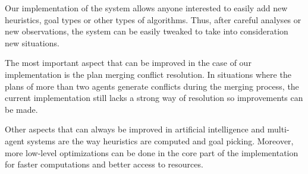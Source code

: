Our implementation of the system allows anyone interested to easily add new heuristics, goal types or other
types of algorithms. Thus, after careful analyses or new observations, the system can be easily tweaked to
take into consideration new situations.

The most important aspect that can be improved in the case of our implementation is the plan merging conflict
resolution. In situations where the plans of more than two agents generate conflicts during the merging
process, the current implementation still lacks a strong way of resolution so improvements can be made.

Other aspects that can always be improved in artificial intelligence and multi-agent systems are the way
heuristics are computed and goal picking. Moreover, more low-level optimizations can be done in the core part
of the implementation for faster computations and better access to resources.